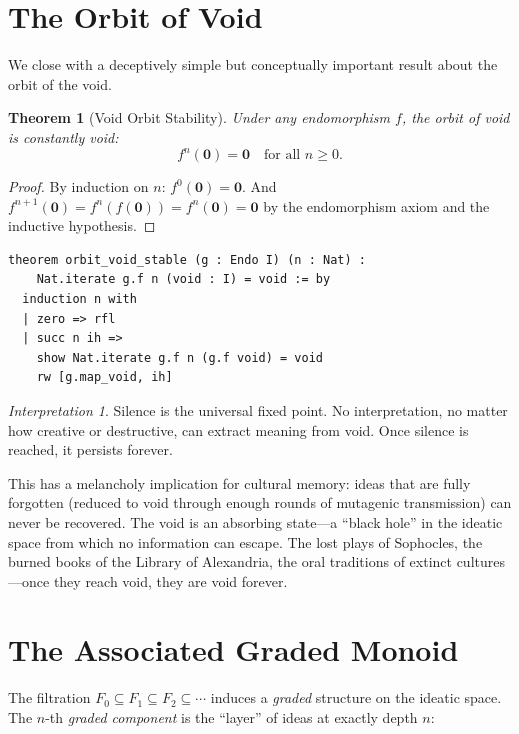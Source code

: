 \documentclass[11pt,openany]{book}
\theoremstyle{definition}
\theoremstyle{plain}
\newtheorem{theorem}[axiom]{Theorem}
\theoremstyle{remark}
\newtheorem{interpretation}[axiom]{Interpretation}
\newcommand{\void}{\mathbf{0}}              %
\begin{document}
\section{The Orbit of Void}

We close with a deceptively simple but conceptually important result about the orbit of the void.

\begin{theorem}[Void Orbit Stability]
\label{thm:void-orbit}
Under any endomorphism $f$, the orbit of void is constantly void:
\[
f^n(\void) = \void \quad \text{for all } n \geq 0.
\]
\end{theorem}

\begin{proof}
By induction on $n$: $f^0(\void) = \void$. And $f^{n+1}(\void) = f^n(f(\void)) = f^n(\void) = \void$ by the endomorphism axiom and the inductive hypothesis.
\end{proof}

\begin{lstlisting}[language=Lean4]
theorem orbit_void_stable (g : Endo I) (n : Nat) :
    Nat.iterate g.f n (void : I) = void := by
  induction n with
  | zero => rfl
  | succ n ih =>
    show Nat.iterate g.f n (g.f void) = void
    rw [g.map_void, ih]
\end{lstlisting}

\begin{interpretation}
Silence is the universal fixed point. No interpretation, no matter how creative or destructive, can extract meaning from void. Once silence is reached, it persists forever.

This has a melancholy implication for cultural memory: ideas that are fully forgotten (reduced to void through enough rounds of mutagenic transmission) can never be recovered. The void is an absorbing state---a ``black hole'' in the ideatic space from which no information can escape. The lost plays of Sophocles, the burned books of the Library of Alexandria, the oral traditions of extinct cultures---once they reach void, they are void forever.
\end{interpretation}

\section{The Associated Graded Monoid}

The filtration $F_0 \subseteq F_1 \subseteq F_2 \subseteq \cdots$ induces a \emph{graded} structure on the ideatic space. The $n$-th \emph{graded component} is the ``layer'' of ideas at exactly depth $n$:
\end{document}
